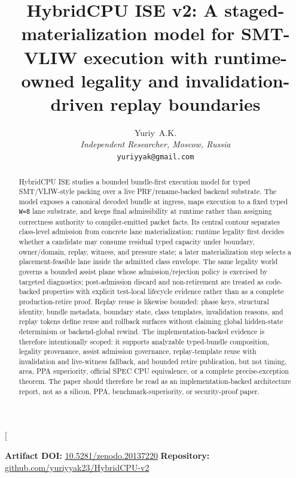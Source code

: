 \documentclass[twocolumn]{article}
\begin{document}
\twocolumn[
  \begin{@twocolumnfalse}

    \title{ HybridCPU ISE v2: 
A staged-materialization model for SMT-VLIW execution with runtime-owned legality and invalidation-driven replay boundaries}
    \author{
      Yuriy~A.K.\\
      \textit{Independent Researcher, Moscow, Russia}\\
      \texttt{yuriyyak@gmail.com}
    }
    \date{}
    \maketitle

    \begin{center}
      \small
      \textbf{Artifact DOI:}
      \href{https://doi.org/10.5281/zenodo.20137220}{10.5281/zenodo.20137220}
      \quad
      \textbf{Repository:}
      \href{https://github.com/yuriyyak23/HybridCPU-v2}{github.com/yuriyyak23/HybridCPU-v2}
    \end{center}

    \begin{abstract}
HybridCPU ISE studies a bounded bundle-first execution model for typed SMT/VLIW-style packing over a live PRF/rename-backed backend substrate. The model exposes a canonical decoded bundle at ingress, maps execution to a fixed typed \texttt{W=8} lane substrate, and keeps final admissibility at runtime rather than assigning correctness authority to compiler-emitted packet facts. Its central contour separates class-level admission from concrete lane materialization: runtime legality first decides whether a candidate may consume residual typed capacity under boundary, owner/domain, replay, witness, and pressure state; a later materialization step selects a placement-feasible lane inside the admitted class envelope. The same legality world governs a bounded assist plane whose admission/rejection policy is exercised by targeted diagnostics; post-admission discard and non-retirement are treated as code-backed properties with explicit test-local lifecycle evidence rather than as a complete production-retire proof. Replay reuse is likewise bounded: phase keys, structural identity, bundle metadata, boundary state, class templates, invalidation reasons, and replay tokens define reuse and rollback surfaces without claiming global hidden-state determinism or backend-global rewind. The implementation-backed evidence is therefore intentionally scoped: it supports analyzable typed-bundle composition, legality provenance, assist admission governance, replay-template reuse with invalidation and live-witness fallback, and bounded retire publication, but not timing, area, PPA superiority, official SPEC CPU equivalence, or a complete precise-exception theorem. The paper should therefore be read as an implementation-backed architecture report, not as a silicon, PPA, benchmark-superiority, or security-proof paper.
    \end{abstract}

    \vspace{2em} %
  \end{@twocolumnfalse}
\end{document}
